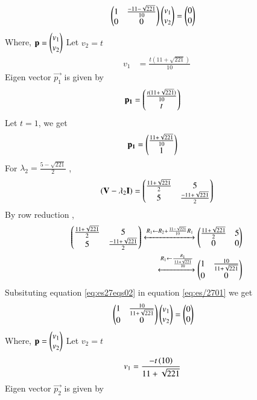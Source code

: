 \documentclass[journal,12pt,twocolumn]{IEEEtran}
\begin{document}
\begin{align}
        & \begin{pmatrix}1 & \frac{-11-\sqrt{221}}{10} \\ 0& 0\end{pmatrix}\begin{pmatrix}v_1 \\ v_2\end{pmatrix}=\begin{pmatrix}0 \\ 0\end{pmatrix}\label{eq:es27/eqei1}
\end{align}
Where, $\mathbf{p}=\begin{pmatrix}v_1\\v_2\end{pmatrix}$
Let $v_2=t$
\begin{align}
    v_1&=\frac{t(11+\sqrt{221})}{10}
\end{align}
Eigen vector $\vec{p_1}$ is given by
\begin{align}
    \mathbf{p_1}&=\begin{pmatrix}\frac{t(11+\sqrt{221})}{10} \\ t\end{pmatrix}
\end{align}
Let $t=1$, we get
\begin{align}
        \mathbf{p_1}&=\begin{pmatrix}\frac{11+\sqrt{221}}{10} \\1 \end{pmatrix}\label{eq:es27/eqp1}
\end{align}
For $\lambda_2=\frac{5-\sqrt{221}}{2}$ ,
\begin{align}
    (\mathbf{V}-\lambda_2\mathbf{I})=\begin{pmatrix}\frac{11+\sqrt{221}}{2} & 5 \\5 & \frac{-11+\sqrt{221}}{2}\end{pmatrix}
\end{align}
By row reduction , 
\begin{align}
    \begin{pmatrix}\frac{11+\sqrt{221}}{2} & 5 \\5 & \frac{-11+\sqrt{221}}{2}\end{pmatrix}
    \xleftrightarrow{R_1\leftarrow R_2+ \frac{11-\sqrt{221}}{10}R_1}
     \begin{pmatrix}\frac{11+\sqrt{221}}{2} &5\\ 0& 0\end{pmatrix}\\  
 \xleftrightarrow{R_1\leftarrow
 \frac{R_1}{\frac{11+\sqrt{221}}{10}}}
    \begin{pmatrix}1 & \frac{10}{11+\sqrt{221}} \\ 0& 0\end{pmatrix}
    \label{eq:es27eqs02}
\end{align}
Subsituting equation \ref{eq:es27eqs02} in equation \ref{eq:es/2701} we get 
\begin{align}
    &\begin{pmatrix}1 & \frac{10}{11+\sqrt{221}} \\0 & 0\end{pmatrix}\begin{pmatrix}v_1 \\ v_2\end{pmatrix}=\begin{pmatrix}0 \\ 0\end{pmatrix}
\end{align}
Where, $\mathbf{p}=\begin{pmatrix}v_1\\v_2\end{pmatrix}$
Let $v_2=t$
\begin{align}
    v_1&=\frac{-t\left(10\right)}{11+\sqrt{221}}
\end{align}
Eigen vector $\vec{p_2}$ is given by
\end{document}

